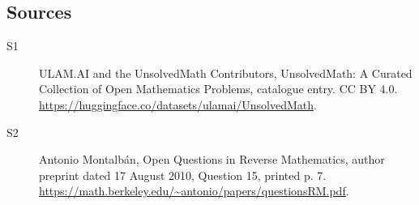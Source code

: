 \documentclass[11pt]{article}
\begin{document}
\subsection{Sources}
\begin{description}
\item[\hypertarget{source:statement:1}{S1}] ULAM.AI and the UnsolvedMath Contributors, UnsolvedMath: A Curated Collection of Open Mathematics Problems, catalogue entry. CC BY 4.0. \url{https://huggingface.co/datasets/ulamai/UnsolvedMath}.
\item[\hypertarget{source:statement:2}{S2}] Antonio Montalbán, Open Questions in Reverse Mathematics, author preprint dated 17 August 2010, Question 15, printed p. 7. \url{https://math.berkeley.edu/~antonio/papers/questionsRM.pdf}.
\end{description}
\label{end:statement}
\end{document}
